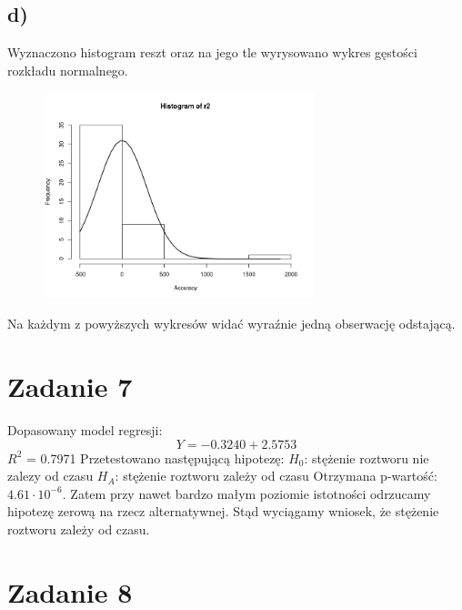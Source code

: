 \documentclass[9pt]{article}  %
\begin{document}
  \subsection{d)}
    Wyznaczono histogram reszt oraz na jego tle wyrysowano wykres gęstości rozkładu normalnego.
      \begin{figure}[H]
      \centering
      \includegraphics[width=0.7\textwidth]{6d.png}
      \caption {}
    \end{figure} 
    
        Na każdym z powyższych wykresów widać wyraźnie jedną obserwację odstającą.

\section{Zadanie 7}

  Dopasowany model regresji:
  $$ Y = -0.3240 + 2.5753$$
  $R^2$ = 0.7971 \newline
  Przetestowano następującą hipotezę: \newline
  $H_0$: stężenie roztworu nie zalezy od czasu \newline
  $H_A$: stężenie roztworu zależy od czasu \newline
  Otrzymana p-wartość: $4.61 \cdot 10^{-6}$.  \newline
  Zatem przy nawet bardzo małym poziomie istotności odrzucamy hipotezę zerową na rzecz alternatywnej. Stąd wyciągamy wniosek, że stężenie roztworu zależy od czasu. 
  


\section{Zadanie 8}
\end{document}
